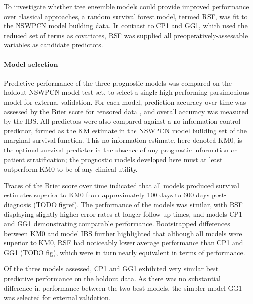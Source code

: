 \documentclass[dissertation.tex]{subfiles}
\begin{document}
To investigate whether tree ensemble models could provide improved performance over classical approaches, a random survival forest model, termed RSF, was fit to the \gls{NSWPCN} model building data.  In contrast to CP1 and GG1, which used the reduced set of terms as covariates, RSF was supplied all preoperatively-assessable variables as candidate predictors.

\paragraph{Model selection}
Predictive performance of the three prognostic models was compared on the holdout \gls{NSWPCN} model test set, to select a single high-performing parsimonious model for external validation.  For each model, prediction accuracy over time was assessed by the Brier score for censored data \cite{Graf1999}, and overall accuracy was measured by the \gls{IBS}.  All predictors were also compared against a no-information control predictor, formed as the \gls{KM} estimate in the \gls{NSWPCN} model building set of the marginal survival function.  This no-information estimate, here denoted KM0, is the optimal survival predictor in the absence of any prognostic information or patient stratification; the prognostic models developed here must at least outperform KM0 to be of any clinical utility.

Traces of the Brier score over time indicated that all models produced survival estimates superior to KM0 from approximately 100 days to 600 days post-diagnosis (TODO figref).  The performance of the models was similar, with RSF displaying slightly higher error rates at longer follow-up times, and models CP1 and GG1 demonstrating comparable performance.  Bootstrapped differences between KM0 and model \Gls{IBS} further highlighted that although all models were superior to KM0, RSF had noticeably lower average performance than CP1 and GG1 (TODO fig), which were in turn nearly equivalent in terms of performance.

Of the three models assessed, CP1 and GG1 exhibited very similar best predictive performance on the holdout data.  As there was no substantial difference in performance between the two best models, the simpler model GG1 was selected for external validation.
\end{document}
